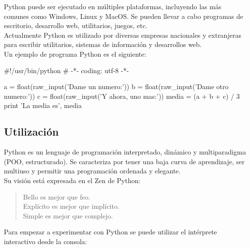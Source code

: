 Python puede ser ejecutado en múltiples plataformas, incluyendo las más comunes como Windows, Linux y MacOS. Se pueden llevar a cabo programas de escritorio, desarrollo web, utilitarios, juegos, etc.\\

Actualmente Python es utilizado por diversas empresas nacionales y extranjeras para escribir utilitarios, sistemas de información y desarrollos web.\\

Un ejemplo de programa Python es el siguiente:\\

\begin{pyglist}
#!/usr/bin/python
# -*- coding: utf-8 -*-

a = float(raw_input('Dame un numero:'))
b = float(raw_input('Dame otro numero:'))
c = float(raw_input('Y ahora, uno mas:'))
media = (a + b + c) / 3
print 'La media es', media                        
\end{pyglist}

\subsection{Utilización}

Python es un lenguaje de programación interpretado, dinámico y multiparadigma (POO, estructurado). Se caracteriza por tener una baja curva de aprendizaje, ser multiuso y permitir una programación ordenada y elegante.\\

Su visión está expresada en el Zen de Python:

\begin{center}
\begin{quote}
Bello es mejor que feo.\\
Explícito es mejor que implícito.\\
Simple es mejor que complejo.
\end{quote}
\end{center}

Para empezar a experimentar con Python se puede utilizar el intérprete interactivo desde la consola:\\

